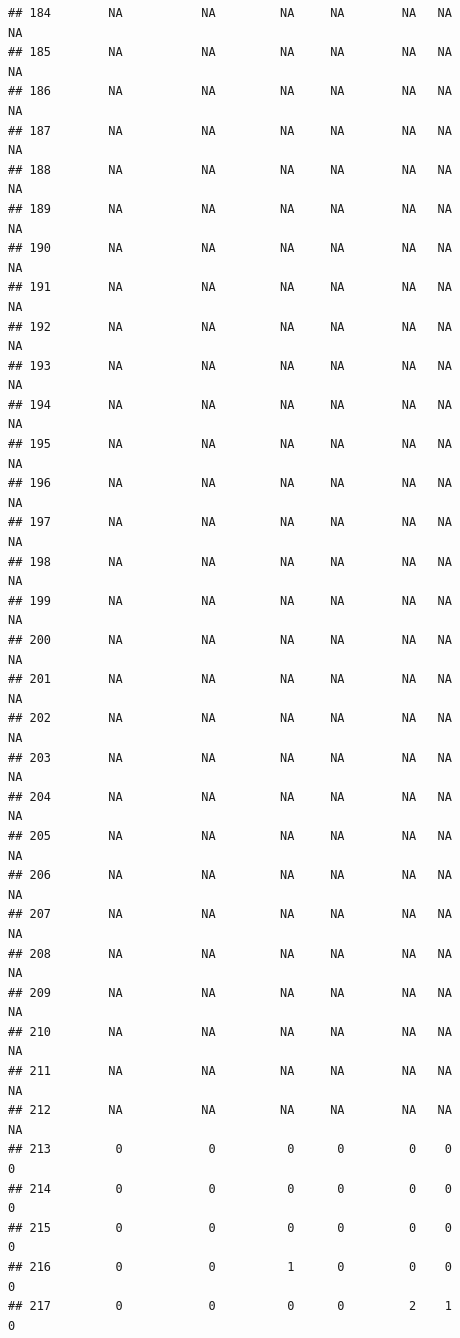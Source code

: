 \documentclass[
]{article}
\begin{document}
\begin{verbatim}
## 184        NA           NA         NA     NA        NA   NA             NA
## 185        NA           NA         NA     NA        NA   NA             NA
## 186        NA           NA         NA     NA        NA   NA             NA
## 187        NA           NA         NA     NA        NA   NA             NA
## 188        NA           NA         NA     NA        NA   NA             NA
## 189        NA           NA         NA     NA        NA   NA             NA
## 190        NA           NA         NA     NA        NA   NA             NA
## 191        NA           NA         NA     NA        NA   NA             NA
## 192        NA           NA         NA     NA        NA   NA             NA
## 193        NA           NA         NA     NA        NA   NA             NA
## 194        NA           NA         NA     NA        NA   NA             NA
## 195        NA           NA         NA     NA        NA   NA             NA
## 196        NA           NA         NA     NA        NA   NA             NA
## 197        NA           NA         NA     NA        NA   NA             NA
## 198        NA           NA         NA     NA        NA   NA             NA
## 199        NA           NA         NA     NA        NA   NA             NA
## 200        NA           NA         NA     NA        NA   NA             NA
## 201        NA           NA         NA     NA        NA   NA             NA
## 202        NA           NA         NA     NA        NA   NA             NA
## 203        NA           NA         NA     NA        NA   NA             NA
## 204        NA           NA         NA     NA        NA   NA             NA
## 205        NA           NA         NA     NA        NA   NA             NA
## 206        NA           NA         NA     NA        NA   NA             NA
## 207        NA           NA         NA     NA        NA   NA             NA
## 208        NA           NA         NA     NA        NA   NA             NA
## 209        NA           NA         NA     NA        NA   NA             NA
## 210        NA           NA         NA     NA        NA   NA             NA
## 211        NA           NA         NA     NA        NA   NA             NA
## 212        NA           NA         NA     NA        NA   NA             NA
## 213         0            0          0      0         0    0              0
## 214         0            0          0      0         0    0              0
## 215         0            0          0      0         0    0              0
## 216         0            0          1      0         0    0              0
## 217         0            0          0      0         2    1              0

\end{verbatim}
\end{document}

